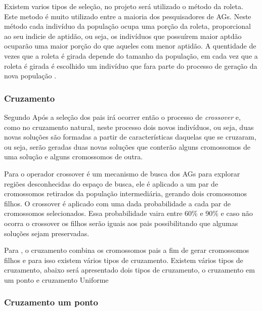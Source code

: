 \par Existem varios tipos de seleção, no projeto será utilizado o método da
roleta. Este metodo é muito utilizado entre a maioria dos pesquisadores de AGs.
Neste método cada indivíduo da população ocupa uma porção da roleta,
proporcional ao seu indicie de aptidão, ou seja, os indivíduos que possuírem
maior aptdão ocuparão uma maior porção do que aqueles com menor aptidão. A
quentidade de vezes que a roleta é girada depende do tamanho da população, em
cada vez que a roleta é girada é escolhido um indivíduo que fara parte do
processo de geração da nova população \cite{REVISTA_MULTIDISCIPLINAR_DA_UNIESP}.

\subsubsection{Cruzamento}

\par Segundo  Após a seleção dos pais irá ocorrer então o
processo de \textit{crossover} e, como no cruzamento natural, neste processo dois novos indivíduos, ou seja, duas
novas soluções são formadas a partir de características daquelas que se
cruzaram, ou seja, serão geradas duas novas soluções que conterão alguns cromossomos
de uma solução e alguns cromossomos de outra.

\par Para  o operador crossover é um
mecanismo de busca dos AGs para explorar regiões desconhecidas do espaço de busca, ele é aplicado a um par de cromossomos
retirados da população intermediária, gerando dois cromossomos filhos. O
crossover é aplicado com uma dada probabilidade a cada par de cromossomos selecionados.
Essa probabilidade vaira entre 60\% e 90\% e caso não ocorra o
crossover os filhos serão iguais aos pais possibilitando que algumas soluções sejam preservadas.

\par Para , o cruzamento combina
os cromossomos pais a fim de gerar cromossomos filhos e para isso existem vários
tipos de cruzamento. Existem vários tipos de cruzamento, abaixo será apresentado
dois tipos de cruzamento, o cruzamento em um ponto e cruzamento Uniforme

\subsubsection{Cruzamento um ponto}


